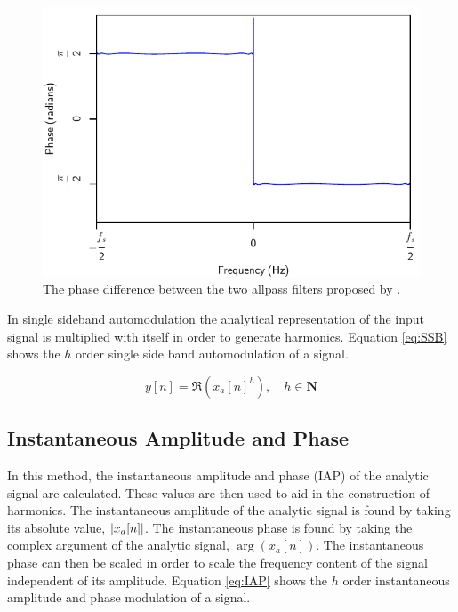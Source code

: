 		\begin{figure}[h!]
			\centering
			\includegraphics{chapter3/Images/IIRHilbertPhaseResponses.pdf}
			\caption{The phase difference between the two allpass filters proposed by
			         \citet{niemitalo2003hilbert}.}
			\label{fig:IIRHilbertPhase}
		\end{figure}

		In single sideband automodulation the analytical representation of the input signal is multiplied with
		itself in order to generate harmonics. Equation \ref{eq:SSB} shows the $h$ order single side
		band automodulation of a signal.

		\begin{equation}
			y[n] = \Re \left( x_{a}[n]^{h} \right), \quad h \in \textbf{N}
			\label{eq:SSB}
		\end{equation}

	\subsection{Instantaneous Amplitude and Phase}
	\label{sec:Excitation-Methods-IAP}
		In this method, the instantaneous amplitude and phase (IAP) of the analytic signal are calculated. These
		values are then used to aid in the construction of harmonics. The instantaneous amplitude of the analytic
		signal is found by taking its absolute value, $\left|x_{a}[n]\right|$. The instantaneous phase is found by taking
		the complex argument of the analytic signal, $\arg(x_{a}[n])$. The instantaneous phase can then be scaled
		in order to scale the frequency content of the signal independent of its amplitude. Equation \ref{eq:IAP}
		shows the $h$ order instantaneous amplitude and phase modulation of a signal.

